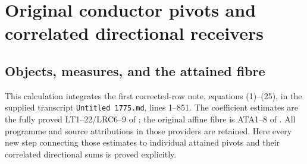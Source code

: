 \begingroup
\section{Original conductor pivots and correlated directional receivers}
\label{sec:CRP}
\subsection{Objects, measures, and the attained fibre}
This calculation integrates the first corrected-row note, equations
(1)--(25), in the supplied transcript \texttt{Untitled 1775.md}, lines
1--851. The coefficient estimates are the fully proved LT1--22/LRC6--9
of ; the original affine fibre is
ATA1--8 of .
All programme and source attributions in those providers are retained.
Here every new step connecting those estimates to individual attained
pivots and their correlated directional sums is proved explicitly.

